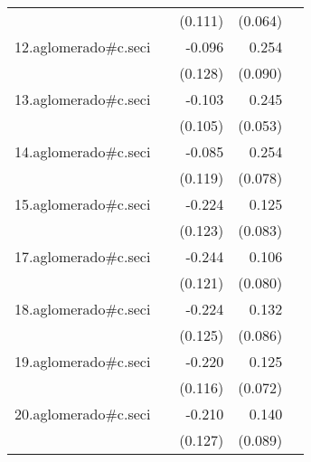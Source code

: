 {\begin{longtable}{l*{4}{D{.}{.}{-1}}}
            &                     &     (0.111)         &     (0.064)         &                     \\
\addlinespace
12.aglomerado#c.seci&                     &      -0.096         &       0.254\sym{**} &                     \\
            &                     &     (0.128)         &     (0.090)         &                     \\
\addlinespace
13.aglomerado#c.seci&                     &      -0.103         &       0.245\sym{***}&                     \\
            &                     &     (0.105)         &     (0.053)         &                     \\
\addlinespace
14.aglomerado#c.seci&                     &      -0.085         &       0.254\sym{**} &                     \\
            &                     &     (0.119)         &     (0.078)         &                     \\
\addlinespace
15.aglomerado#c.seci&                     &      -0.224         &       0.125         &                     \\
            &                     &     (0.123)         &     (0.083)         &                     \\
\addlinespace
17.aglomerado#c.seci&                     &      -0.244\sym{*}  &       0.106         &                     \\
            &                     &     (0.121)         &     (0.080)         &                     \\
\addlinespace
18.aglomerado#c.seci&                     &      -0.224         &       0.132         &                     \\
            &                     &     (0.125)         &     (0.086)         &                     \\
\addlinespace
19.aglomerado#c.seci&                     &      -0.220         &       0.125         &                     \\
            &                     &     (0.116)         &     (0.072)         &                     \\
\addlinespace
20.aglomerado#c.seci&                     &      -0.210         &       0.140         &                     \\
            &                     &     (0.127)         &     (0.089)         &                     \\

\end{longtable}}
